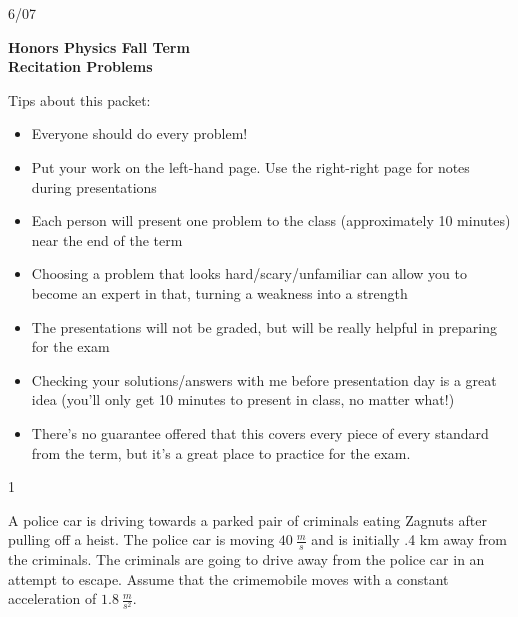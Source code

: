 


\hfill {\large 6/07}
\bigskip



{\bf {\Huge Honors Physics Fall Term \\ Recitation Problems}}

\bigskip
{\large Tips about this packet:
\begin{itemize} \itemsep1pt \parskip0pt  
\renewcommand{\labelitemi}{$\rightarrow$}
\item Everyone should do every problem!
\item Put your work on the left-hand page. Use the right-right page for notes during presentations
\item Each person will present one problem to the class (approximately 10 minutes) near the end of the term
\item Choosing a problem that looks hard/scary/unfamiliar can allow you to become an expert in that, turning a weakness into a strength
\item The presentations will not be graded, but will be really helpful in preparing for the exam
\item Checking your solutions/answers with me before presentation day is a great idea (you'll only get 10 minutes to present in class, no matter what!)
\item There's no guarantee offered that this covers every piece of every standard from the term, but it's a great place to practice for the exam.
\end{itemize}}

\newpage


\AddToShipoutPicture*{\BackgroundPic}

\addtocounter {ProbNum} {1}

 
{\bf \Large{}} A police car is driving towards a parked pair of criminals eating Zagnuts after pulling off a heist. The police car is moving ${40~\tfrac{m}{s}}$ and is initially .4 km away from the criminals. The criminals are going to drive away from the police car in an attempt to escape.  Assume that the crimemobile moves with a constant acceleration of ${1.8~\tfrac{m}{s^2}}$. 


